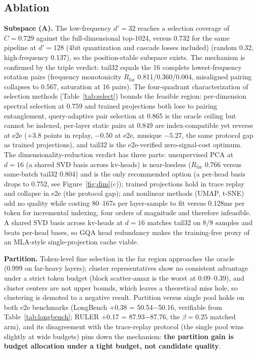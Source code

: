 \documentclass[11pt]{article}
\begin{document}
\subsection{Ablation}

\textbf{Subspace (A).} The low-frequency $d'{=}32$ reaches a selection coverage of $C{=}0.729$ against the full-dimensional top-1024, versus 0.732 for the same pipeline at $d'{=}128$ (4bit quantization and cascade losses included) (random 0.32, high-frequency 0.137), so the position-stable subspace exists. The mechanism is confirmed by the triple verdict: tail32 equals the 16 complete lowest-frequency rotation pairs (frequency monotonicity $R_{\mathrm{far}}$ 0.811/0.360/0.004, misaligned pairing collapses to 0.567, saturation at 16 pairs). The four-quadrant characterization of selection methods (Table~\ref{tab:select}) bounds the feasible region: per-dimension spectral selection at 0.759 and trained projections both lose to pairing entanglement, query-adaptive pair selection at 0.865 is the oracle ceiling but cannot be indexed, per-layer static pairs at 0.849 are index-compatible yet reverse at e2e ($+3.8$ points in replay, $-0.50$ at e2e, musique $-5.27$, the same protocol gap as trained projections), and tail32 is the e2e-verified zero-signal-cost optimum. The dimensionality-reduction verdict has three parts: unsupervised PCA at $d{=}16$ (a shared SVD basis across kv-heads) is near-lossless ($R_{\mathrm{far}}$ 0.766 versus same-batch tail32 0.804) and is the only recommended option (a per-head basis drops to 0.752, see Figure~\ref{fig:dim}(c)); trained projections hold in trace replay and collapse in e2e (the protocol gap); and nonlinear methods (UMAP, t-SNE) add no quality while costing 80--167s per layer-sample to fit versus 0.128ms per token for incremental indexing, four orders of magnitude and therefore infeasible. A shared SVD basis across kv-heads at $d{=}16$ matches tail32 on 8/8 samples and beats per-head bases, so GQA head redundancy makes the training-free proxy of an MLA-style single-projection cache viable.

\textbf{Partition.} Token-level fine selection in the far region approaches the oracle (0.999 on far-heavy layers); cluster representatives show no consistent advantage under a strict token budget (block scatter-amax is the worst at 0.09--0.39), and cluster centers are not upper bounds, which leaves a theoretical miss hole, so clustering is demoted to a negative result. Partition versus single pool holds on both e2e benchmarks (LongBench +0.38 = 50.54$-$50.16, verifiable from Table~\ref{tab:longbench}; RULER +0.17 = 87.93$-$87.76, the $\beta{=}0.25$ matched arm), and its disagreement with the trace-replay protocol (the single pool wins slightly at wide budgets) pins down the mechanism: \textbf{the partition gain is budget allocation under a tight budget, not candidate quality}.
\end{document}
